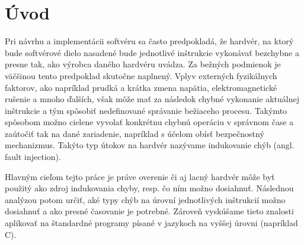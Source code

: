 \chapter*{Úvod} %

Pri návrhu a implementácii softvéru sa často predpokladá, že hardvér, na ktorý bude softvérové dielo nasadené bude jednotlivé inštrukcie vykonávať bezchybne a presne tak, ako výrobca daného hardvéru uvádza. Za bežných podmienok je väčšinou tento predpoklad skutočne naplnený. Vplyv externých fyzikálnych faktorov, ako napríklad prudká a krátka zmena napätia, elektromagnetické rušenie a mnoho ďalších, však môže mať za následok chybné vykonanie aktuálnej inštrukcie a tým spôsobiť nedefinované správanie bežiaceho procesu. Takýmto spôsobom možno cielene vyvolať konkrétnu chybnú operáciu v správnom čase a zaútočiť tak na dané zariadenie, napríklad s účelom obísť bezpečnostný mechanizmus. Takýto typ útokov na hardvér nazývame indukovanie chýb (angl. fault injection).

Hlavným cieľom tejto práce je práve overenie či aj lacný hardvér môže byť použitý ako zdroj indukovania chyby, resp. čo ním možno dosiahnuť. Následnou analýzou potom určiť, aké typy chýb na úrovní jednotlivých inštrukcií možno dosiahnuť a ako presné časovanie je potrebné. Zároveň vyskúšame tieto znalosti aplikovať na štandardné programy písané v jazykoch na vyššej úrovni (napríklad C).